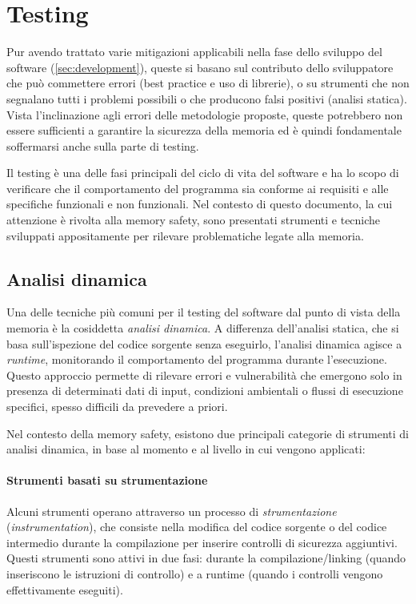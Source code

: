 \section{Testing}
\label{sec:testing}

Pur avendo trattato varie mitigazioni applicabili nella fase dello sviluppo del software
(\autoref{sec:development}), queste si basano sul contributo dello sviluppatore
che può commettere errori (best practice e uso di librerie), o su strumenti che non
segnalano tutti i problemi possibili o che producono falsi positivi (analisi
statica). Vista l'inclinazione agli errori delle metodologie proposte, queste potrebbero
non essere sufficienti a garantire la sicurezza della memoria ed è quindi fondamentale
soffermarsi anche sulla parte di testing.

Il testing è una delle fasi principali del ciclo di vita del software e ha lo scopo
di verificare che il comportamento del programma sia conforme ai requisiti e alle
specifiche funzionali e non funzionali. Nel contesto di questo documento, la cui
attenzione è rivolta alla memory safety, sono presentati strumenti e tecniche
sviluppati appositamente per rilevare problematiche legate alla memoria.

\subsection{Analisi dinamica}
\label{sec:analisi-dinamica}

Una delle tecniche più comuni per il testing del software dal punto di vista della
memoria è la cosiddetta \textit{analisi dinamica}. A differenza dell'analisi statica,
che si basa sull'ispezione del codice sorgente senza eseguirlo, l'analisi dinamica
agisce a \textit{runtime}, monitorando il comportamento del programma durante l'esecuzione.
Questo approccio permette di rilevare errori e vulnerabilità che emergono solo
in presenza di determinati dati di input, condizioni ambientali o flussi di esecuzione
specifici, spesso difficili da prevedere a priori.

Nel contesto della memory safety, esistono due principali categorie di strumenti
di analisi dinamica, in base al momento e al livello in cui vengono applicati:

\paragraph{Strumenti basati su strumentazione}
Alcuni strumenti operano attraverso un processo di \textit{strumentazione} (\textit{instrumentation}),
che consiste nella modifica del codice sorgente o del codice intermedio durante
la compilazione per inserire controlli di sicurezza aggiuntivi. Questi strumenti
sono attivi in due fasi: durante la compilazione/linking (quando inseriscono le istruzioni
di controllo) e a runtime (quando i controlli vengono effettivamente eseguiti).


